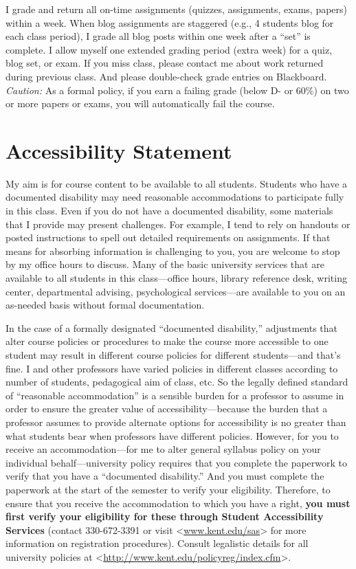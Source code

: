 \documentclass[]{article}
\begin{document}
I grade and return all on-time assignments (quizzes, assignments, exams,
papers) within a week. When blog assignments are staggered (e.g., 4
students blog for each class period), I grade all blog posts within one
week after a ``set'' is complete. I allow myself one extended grading
period (extra week) for a quiz, blog set, or exam. If you miss class,
please contact me about work returned during previous class. And please
double-check grade entries on Blackboard. \emph{Caution:} As a formal
policy, if you earn a failing grade (below D- or 60\%) on two or more
papers or exams, you will automatically fail the course.

\section{Accessibility Statement}\label{accessibility-statement}

My aim is for course content to be available to all students. Students
who have a documented disability may need reasonable accommodations to
participate fully in this class. Even if you do not have a documented
disability, some materials that I provide may present challenges. For
example, I tend to rely on handouts or posted instructions to spell out
detailed requirements on assignments. If that means for absorbing
information is challenging to you, you are welcome to stop by my office
hours to discuss. Many of the basic university services that are
available to all students in this class---office hours, library
reference desk, writing center, departmental advising, psychological
services---are available to you on an as-needed basis without formal
documentation.

In the case of a formally designated ``documented disability,''
adjustments that alter course policies or procedures to make the course
more accessible to one student may result in different course policies
for different students---and that's fine. I and other professors have
varied policies in different classes according to number of students,
pedagogical aim of class, etc. So the legally defined standard of
``reasonable accommodation'' is a sensible burden for a professor to
assume in order to ensure the greater value of accessibility---because
the burden that a professor assumes to provide alternate options for
accessibility is no greater than what students bear when professors have
different policies. However, for you to receive an accommodation---for
me to alter general syllabus policy on your individual
behalf---university policy requires that you complete the paperwork to
verify that you have a ``documented disability.'' And you must complete
the paperwork at the start of the semester to verify your eligibility.
Therefore, to ensure that you receive the accommodation to which you
have a right, \textbf{you must first verify your eligibility for these
through Student Accessibility Services} (contact 330-672-3391 or visit
\textless{}\url{www.kent.edu/sas}\textgreater{} for more information on
registration procedures). Consult legalistic details for all university
policies at
\textless{}\url{http://www.kent.edu/policyreg/index.cfm}\textgreater{}.
\end{document}
